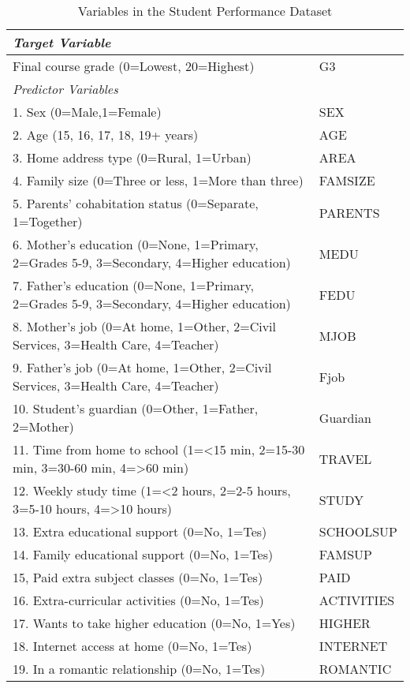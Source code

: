 \documentclass[sigconf]{acmart}
\begin{document}
\begin{table*}[ht]
  \caption{Variables in the Student Performance Dataset \cite{cortez08}}
  \label{tab:freq}
  \begin{tabular}{ll}
    \toprule
    \textit{Target Variable} &  \\
    \midrule
    Final course grade (0=Lowest, 20=Highest) & G3 \\
    \midrule
    \textit{Predictor Variables} &    \\
    \midrule
    1. Sex (0=Male,1=Female) & SEX  \\  
    2. Age (15, 16, 17, 18, 19+ years) & AGE  \\
    3. Home address type (0=Rural, 1=Urban) & AREA  \\
    4. Family size (0=Three or less, 1=More than three) & FAMSIZE  \\
    5. Parents' cohabitation status (0=Separate, 1=Together) & PARENTS  \\ 
    6. Mother's education (0=None, 1=Primary, 2=Grades 5-9,  3=Secondary, 4=Higher education) & MEDU  \\
    7. Father's education (0=None, 1=Primary, 2=Grades 5-9,  3=Secondary, 4=Higher education) & FEDU  \\
    8. Mother's job (0=At home, 1=Other, 2=Civil Services, 3=Health Care, 4=Teacher) & MJOB  \\
    9. Father's job (0=At home, 1=Other, 2=Civil Services, 3=Health Care, 4=Teacher) & Fjob  \\
    10. Student's guardian (0=Other, 1=Father, 2=Mother) & Guardian  \\
    11. Time from home to school (1=<15 min, 2=15-30 min, 3=30-60 min, 4=>60 min) & TRAVEL  \\
    12. Weekly study time (1=<2 hours, 2=2-5 hours, 3=5-10 hours, 4=>10 hours) & STUDY  \\
    13. Extra educational support (0=No, 1=Tes) & SCHOOLSUP  \\
    14. Family educational support (0=No, 1=Tes) & FAMSUP  \\
    15, Paid extra subject classes (0=No, 1=Tes) & PAID  \\
    16. Extra-curricular activities (0=No, 1=Tes) & ACTIVITIES  \\
    17. Wants to take higher education (0=No, 1=Yes) & HIGHER  \\
    18. Internet access at home (0=No, 1=Tes) & INTERNET  \\
    19. In a romantic relationship (0=No, 1=Tes) & ROMANTIC  \\

\end{tabular}
\end{table*}
\end{document}
